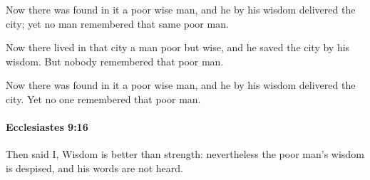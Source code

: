 			\begin{versebox}
					\item[BHS] 
					\item[LXX] 
					\item[ASV] Now there was found in it a poor wise man, and he by his wisdom delivered the city; yet no man remembered that same poor man.
					\item[NIV] Now there lived in that city a man poor but wise, and he saved the city by his wisdom. But nobody remembered that poor man.
					\item[NRSV] Now there was found in it a poor wise man, and he by his wisdom delivered the city. Yet no one remembered that poor man.
			\end{versebox}

		\paragraph{Ecclesiastes 9:16} %
			\label{ECCLESIASTES-9-16}

			Then said I, Wisdom is better than strength: nevertheless the poor man’s wisdom is despised, and his words are not heard.

